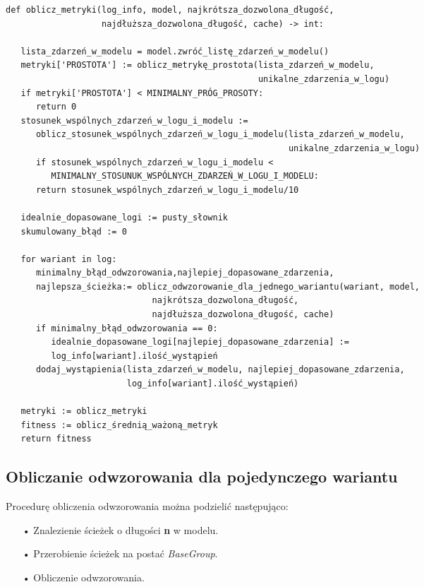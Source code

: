 \lstset{caption=Pseudokod metody oblicz metryki, captionpos=b}
\lstset{label=src:obl_met, frame=single}
\begin{lstlisting}[escapeinside=``]
def oblicz_metryki(log_info, model, najkrótsza_dozwolona_długość, 
                   najdłuższa_dozwolona_długość, cache) -> int:
                   
   lista_zdarzeń_w_modelu = model.zwróć_listę_zdarzeń_w_modelu()
   metryki['PROSTOTA'] := oblicz_metrykę_prostota(lista_zdarzeń_w_modelu, 
                                                  unikalne_zdarzenia_w_logu)
   if metryki['PROSTOTA'] < MINIMALNY_PRÓG_PROSOTY:
      return 0
   stosunek_wspólnych_zdarzeń_w_logu_i_modelu := 
      oblicz_stosunek_wspólnych_zdarzeń_w_logu_i_modelu(lista_zdarzeń_w_modelu, 
                                                        unikalne_zdarzenia_w_logu)		   
      if stosunek_wspólnych_zdarzeń_w_logu_i_modelu <
         MINIMALNY_STOSUNUK_WSPÓLNYCH_ZDARZEŃ_W_LOGU_I_MODELU:
      return stosunek_wspólnych_zdarzeń_w_logu_i_modelu/10
        
   idealnie_dopasowane_logi := pusty_słownik
   skumulowany_błąd := 0
    
   for wariant in log:
      minimalny_błąd_odwzorowania,najlepiej_dopasowane_zdarzenia,
      najlepsza_ścieżka:= oblicz_odwzorowanie_dla_jednego_wariantu(wariant, model, 
                             najkrótsza_dozwolona_długość, 
                             najdłuższa_dozwolona_długość, cache)
      if minimalny_błąd_odwzorowania == 0:
         idealnie_dopasowane_logi[najlepiej_dopasowane_zdarzenia] := 
         log_info[wariant].ilość_wystąpień
      dodaj_wystąpienia(lista_zdarzeń_w_modelu, najlepiej_dopasowane_zdarzenia, 
                        log_info[wariant].ilość_wystąpień)

   metryki := oblicz_metryki 
   fitness := oblicz_średnią_ważoną_metryk
   return fitness
\end{lstlisting}

\subsection{Obliczanie odwzorowania dla pojedynczego wariantu}
Procedurę obliczenia odwzorowania można podzielić następująco:
\begin{itemize}
  \item[•] Znalezienie ścieżek o długości \textbf{n} w modelu.
  \item[•] Przerobienie ścieżek na postać \textit{BaseGroup}.
  \item[•] Obliczenie odwzorowania.
\end{itemize}

